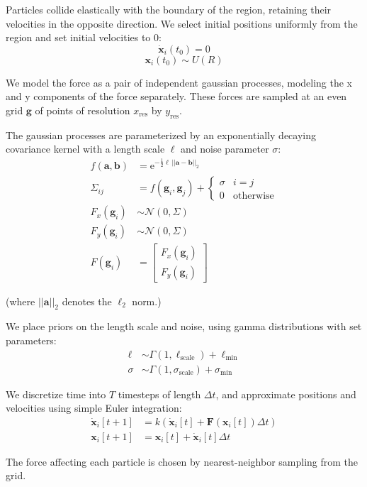 \documentclass[11pt]{article}
\newcommand{\samples}[0]{\sim}
\newcommand{\xv}[0]{\mathbf{x}}
\newcommand{\Fv}[0]{\mathbf{F}}
\newcommand{\xres}[0]{x_{\mathrm{res}}}
\newcommand{\yres}[0]{y_{\mathrm{res}}}
\newcommand{\dt}[0]{\Delta t}
\newcommand{\av}[0]{\mathbf{a}}
\newcommand{\bv}[0]{\mathbf{b}}
\newcommand{\gv}[0]{\mathbf{g}}
\newcommand{\scale}[0]{\mathrm{scale}}
\begin{document}
Particles collide elastically with the boundary of the region, retaining their velocities in the opposite direction. We select initial positions uniformly from the region and set initial velocities to 0:
$$\dot{\xv}_i(t_0) = 0$$
$$\xv_i(t_0) \samples U(R)$$

We model the force as a pair of independent gaussian processes, modeling the x and y components of the force separately. These forces are sampled at an even grid \(\gv\) of points of resolution \(\xres\) by \(\yres\).

The gaussian processes are parameterized by an exponentially decaying covariance kernel with a length scale \(\ell\) and noise parameter \(\sigma\):
\begin{align*}
f(\av, \bv) &= \mathrm{e}^{- \frac{1}{2} \ell \, ||\av-\bv||_2} \\
\Sigma_{ij} &= f(\gv_i, \gv_j) + \begin{cases}
   \sigma & i=j \\
   0 & \mathrm{otherwise}
\end{cases}\\
F_x(\gv_i) &\samples \mathcal{N}(0, \Sigma) \\
F_y(\gv_i) &\samples \mathcal{N}(0, \Sigma) \\
F(\gv_i) &= \begin{bmatrix}
  F_x(\gv_i) \\
  F_y(\gv_i)
\end{bmatrix}
\end{align*}

(where \(||\av||_2\) denotes the \(\ell_2\) norm.)

We place priors on the length scale and noise, using gamma distributions with set parameters:
\begin{align*}
\ell &\samples \Gamma(1, \ell_{\scale}) + \ell_{\min} \\
\sigma &\samples \Gamma(1, \sigma_{\scale}) + \sigma_{\min}
\end{align*}

We discretize time into \(T\) timesteps of length \(\dt\), and approximate positions and velocities using simple Euler integration:
\begin{align*}
\dot{\xv}_i[t+1] &= k (\dot{\xv}_i[t] + \Fv(\xv_i[t]) \dt) \\
\xv_i[t+1] &= \xv_i[t] + \dot{\xv}_i[t] \dt
\end{align*}

The force affecting each particle is chosen by nearest-neighbor sampling from the grid.
\end{document}
